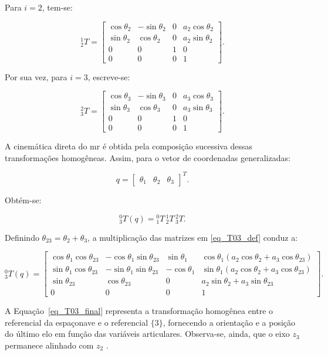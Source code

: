 Para $i=2$, tem-se:

\begin{equation}
{}^{1}_{2}T=
\begin{bmatrix}
\cos\theta_{2} & -\sin\theta_{2} & 0 & a_{2}\cos\theta_{2} \\
\sin\theta_{2} & \cos\theta_{2} & 0 & a_{2}\sin\theta_{2} \\
0 & 0 & 1 & 0 \\
0 & 0 & 0 & 1
\end{bmatrix}.
\label{eq_T12_antropomorfico}
\end{equation}

Por sua vez, para $i=3$, escreve-se:

\begin{equation}
{}^{2}_{3}T=
\begin{bmatrix}
\cos\theta_{3} & -\sin\theta_{3} & 0 & a_{3}\cos\theta_{3} \\
\sin\theta_{3} & \cos\theta_{3} & 0 & a_{3}\sin\theta_{3} \\
0 & 0 & 1 & 0 \\
0 & 0 & 0 & 1
\end{bmatrix}.
\label{eq_T23_antropomorfico}
\end{equation}

A cinemática direta do \gls{mr} é obtida pela composição sucessiva dessas transformações homogêneas.
Assim, para o vetor de coordenadas generalizadas:

\begin{equation}
q=
\begin{bmatrix}
\theta_{1} & \theta_{2} & \theta_{3}
\end{bmatrix}^{T}.
\end{equation}

Obtém-se: 

\begin{equation}
{}^{0}_{3}T(q)={}^{0}_{1}T\,{}^{1}_{2}T\,{}^{2}_{3}T.
\label{eq_T03_def}
\end{equation}

Definindo $\theta_{23}=\theta_{2}+\theta_{3}$, a multiplicação das matrizes em \eqref{eq_T03_def} conduz a:

\begin{equation}
{}^{0}_{3}T(q)=
\begin{bmatrix}
\cos\theta_{1}\cos\theta_{23} & -\cos\theta_{1}\sin\theta_{23} & \sin\theta_{1} & \cos\theta_{1}\left(a_{2}\cos\theta_{2}+a_{3}\cos\theta_{23}\right) \\
\sin\theta_{1}\cos\theta_{23} & -\sin\theta_{1}\sin\theta_{23} & -\cos\theta_{1} & \sin\theta_{1}\left(a_{2}\cos\theta_{2}+a_{3}\cos\theta_{23}\right) \\
\sin\theta_{23} & \cos\theta_{23} & 0 & a_{2}\sin\theta_{2}+a_{3}\sin\theta_{23} \\
0 & 0 & 0 & 1
\end{bmatrix}.
\label{eq_T03_final}
\end{equation}

A Equação~\eqref{eq_T03_final} representa a transformação homogênea entre o referencial da espaçonave e o referencial $\{3\}$, fornecendo a orientação e a posição do último elo em função das variáveis articulares.
Observa-se, ainda, que o eixo $z_{3}$ permanece alinhado com $z_{2}$ \cite{sciavicco_siciliano2010}.
